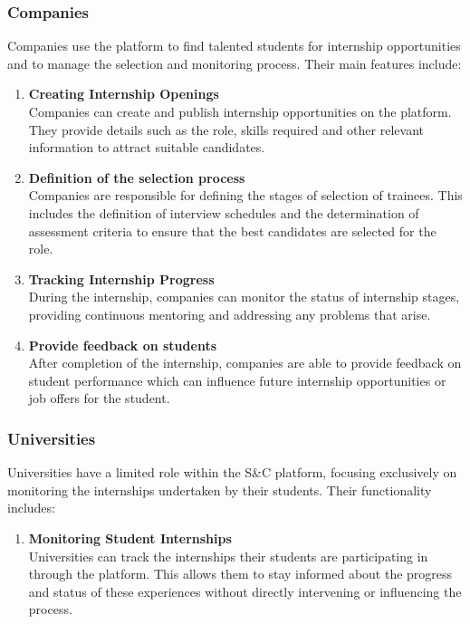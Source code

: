     \subsubsection{Companies}
    Companies use the platform to find talented students for internship opportunities and to manage the selection and monitoring process. Their main features include:
    \begin{enumerate}[label=\textbullet, itemsep=0em]
        \item \textbf{Creating Internship Openings}
        \\ Companies can create and publish internship opportunities on the platform. They provide details such as the role, skills required and other relevant information to attract suitable candidates.

        \item \textbf{Definition of the selection process}
        \\ Companies are responsible for defining the stages of selection of trainees. This includes the definition of interview schedules and the determination of assessment criteria to ensure that the best candidates are selected for the role.

        \item  \textbf{Tracking Internship Progress}
        \\ During the internship, companies can monitor the status of internship stages, providing continuous mentoring and addressing any problems that arise.

        \item \textbf{Provide feedback on students}
        \\ After completion of the internship, companies are able to provide feedback on student performance which can influence future internship opportunities or job offers for the student.
    \end{enumerate}
    
    \subsubsection{Universities}
    Universities have a limited role within the S\&C platform, focusing exclusively on monitoring the internships undertaken by their students. Their functionality includes:
    \begin{enumerate}[label=\textbullet, itemsep=0em]
        \item \textbf{Monitoring Student Internships}
        \\ Universities can track the internships their students are participating in through the platform. This allows them to stay informed about the progress and status of these experiences without directly intervening or influencing the process.
    \end{enumerate}
    
